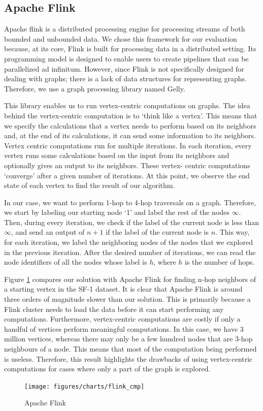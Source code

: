 \subsection{Apache Flink}\label{sec:flinkCmp}
Apache flink\cite{flink} is a distributed processing engine for processing
streams of both bounded and unbounded data. We chose this framework for our
evaluation because, at its core, Flink is built for processing data in a
distributed setting. Its programming model is designed to enable users to create 
pipelines that can be parallelized ad infinitum. However, since
Flink is not specifically designed for dealing with graphs; there is a lack of
data structures for representing graphs. Therefore, we use a graph processing
library named Gelly\cite{flinkGelly}.

\smallskip
This library enables us to run vertex-centric computations on graphs. 
The idea behind the vertex-centric
computation is to `think like a vertex'. This means that we specify the 
calculations that a vertex needs to perform based on its neighbors and, at the
end of its calculations, it can send some information to its
neighbors. Vertex centric computations run for multiple iterations. In each
iteration, every vertex runs some calculations based on the input from its
neighbors and optionally gives an output to its neighbors. These vertex-
centric computations `converge' after a given number of iterations. At this
point, we observe the end state of each vertex to find the result of our
algorithm.  

\smallskip
In our case, we want to perform 1-hop to 4-hop traversals on a graph. Therefore,
we start by labeling our starting node `1' and label the rest of the nodes
$\infty$. Then, during every iteration, we check if the label of the current node
is less than $\infty$, and send an output of $n+1$ if the label of the current
node is $n$. This way, for each iteration, we label the neighboring nodes of
the nodes that we explored in the previous iteration. After the desired number
of iterations, we can read the node identifiers of all the nodes whose label
is $h$, where $h$ is the number of hops.

Figure \ref{fig:flinkCmp} compares our solution with Apache
Flink for finding n-hop neighbors of a starting vertex in the SF-1 dataset. 
It is clear that Apache
Flink is around three orders of magnitude slower than our solution. This is
primarily because a Flink cluster needs to load the data before it can start
performing any computations. Furthermore, vertex-centric computations are
costly if only a handful of vertices perform meaningful
computations. In this case, we have 3 million vertices, whereas there may only be
a few hundred nodes that are 3-hop neighbours of a node. This means that most of
the computation being performed is useless. Therefore, this result highlights
the drawbacks of using vertex-centric computations for cases where only a part
of the graph is explored.
\begin{figure}[ht]
    \centering
    \texttt{[image: figures/charts/flink\_cmp]}
    \caption{Apache Flink}
    \label{fig:flinkCmp}
\end{figure}


